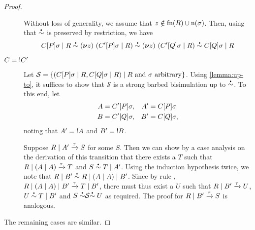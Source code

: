 \begin{proof}
\begin{description}
    Without loss of generality, we assume that \( z \notin \textrm{fn}(R) \cup \textrm{n}(\sigma) \).
    Then, using that \( \sbbisim{}{} \) is preserved by restriction, we have
    \begin{equation*}
      \sbbisim{\sbbisim{\Ppar{\applysubst{\sigma}{\applyctx{C}{P}}}{R}}{\Pres{z}{(\Ppar{\applysubst{\sigma}{\applyctx{C'}{P}}}{R})}}}{\sbbisim{\Pres{z}{(\Ppar{\applysubst{\sigma}{\applyctx{C'}{Q}}}{R})}}{\Ppar{\applysubst{\sigma}{\applyctx{C}{Q}}}{R}}}
    \end{equation*}
  \item[\( C = {!}C' \)] Let \( \mathcal{S} = \{ (C[P]\sigma \mid R, C[Q]\sigma \mid R) \mid \text{$R$ and $\sigma$ arbitrary} \} \).
    Using \cref{lemma:up-to}, it suffices to show that \( \mathcal{S} \) is a strong barbed bisimulation up to \( \sbbisim{}{} \).
    To this end, let
    \begin{align*}
      A &= C'[P]\sigma, & A' &= C[P]\sigma \\
      B &= C'[Q]\sigma, & B' &= C[Q]\sigma ,
    \end{align*}
    noting that \( A' = {!}A \) and \( B' = {!}B \).

    Suppose \( R \mid A' \xrightarrow{\tau} S \) for some \( S \).
    Then we can show by a case analysis on the derivation of this transition that there exists a \( T \) such that \( R \mid (A \mid A) \xrightarrow{\tau} T \) and \( \sbbisim{S}{\Ppar{T}{A'}} \).
    Using the induction hypothesis twice, we note that \( \sbbisim{\Ppar{R}{B'}}{\Ppar{R}{\Ppar{(\Ppar{A}{A})}{B'}}} \).
    Since by rule , \( R \mid (A \mid A) \mid B' \xrightarrow{\tau} T \mid B' \), there must thus exist a \( U \) such that \( R \mid B' \xrightarrow{\tau} U \), \( \sbbisim{U}{\Ppar{T}{B'}} \) and \( \uptosbb{S}{\mathcal{S}}{U} \) as required.
    The proof for \( R \mid B' \xrightarrow{\tau} S \) is analogous.
  \end{description}
  The remaining cases are similar.
\end{proof}